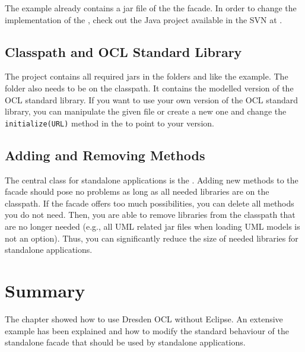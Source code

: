 The example already contains a jar file of the the facade. In order to change 
the implementation of the , check out the Java project 
available in the SVN 
 at .


\subsection{Classpath and OCL Standard Library}
The project contains all required jars in the folders  and 
 like the example. The  folder also 
needs to be on the classpath. It contains the modelled version of the OCL 
standard library. If you want to use your own version of the OCL standard 
library, you can manipulate the given file or create a new one and change the
\lstinline[breaklines=true]{initialize(URL)} method in the 
 to point to your version.


\subsection{Adding and Removing Methods}
The central class for standalone applications is the . 
Adding new methods to the facade should pose no problems as long as all needed
libraries are on the classpath. If the facade offers too much possibilities, 
you can delete all methods you do not need. Then, you are able to remove 
libraries from the classpath that are no longer needed (e.g., all UML related 
jar files when loading UML models is not an option). Thus, you can significantly
reduce the size of needed libraries for standalone applications.


\section{Summary}

The chapter showed how to use Dresden OCL without Eclipse. An extensive example
has been explained and how to modify the standard behaviour of the standalone 
facade that should be used by standalone applications.

